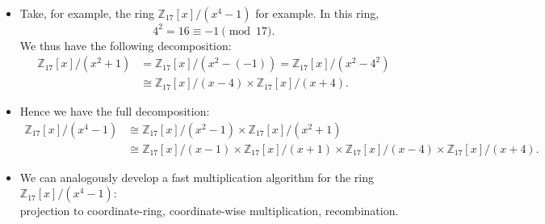 \begin{frame}
    \begin{itemize}

        \item <1->Take, for example, the ring \( \mathbb{Z}_{17}[x]/(x^{4}-1)\) for example. 
            In this ring,
            \[
                4^{2} = 16 \equiv -1 \pmod{17}.
            \]
            We thus have the following decomposition:
            \begin{align*}
                \mathbb{Z}_{17}[x]/(x^{2}+1) 
                &= \mathbb{Z}_{17}[x] / (x^{2} - (-1))
                = \mathbb{Z}_{17}[x] / (x^{2} - 4^{2})\\
                &\cong 
                \mathbb{Z}_{17}[x]/(x-4) \times 
                \mathbb{Z}_{17}[x]/(x+4).
            \end{align*}

        \item <2->Hence we have the full decomposition:
            \begin{align*}
                \mathbb{Z}_{17}[x]/(x^{4}-1) 
                &\cong 
                \mathbb{Z}_{17}[x]/(x^{2}-1) \times 
                \mathbb{Z}_{17}[x]/(x^{2}+1)\\
                &\cong 
                \mathbb{Z}_{17}[x]/(x-1) \times 
                \mathbb{Z}_{17}[x]/(x+1) \times 
                \mathbb{Z}_{17}[x]/(x-4) \times 
                \mathbb{Z}_{17}[x]/(x+4).
            \end{align*}

        \item <3->We can analogously develop a fast multiplication algorithm for the ring 
            \( \mathbb{Z}_{17}[x]/(x^{4}-1) \):\\
            projection to coordinate-ring, coordinate-wise multiplication, recombination.
    \end{itemize}
\end{frame}


